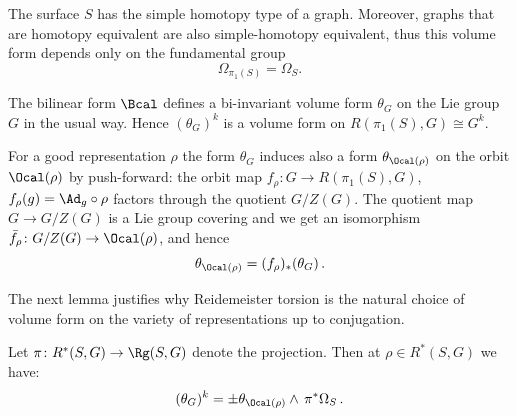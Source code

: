 The surface $S$ has the simple homotopy type of a graph. Moreover, graphs that are homotopy equivalent are also simple-homotopy equivalent, thus this volume form depends only on the fundamental group
\[
\Omega_{\pi_1(S)}=\Omega_S.
\]

The bilinear form $\Bcal$ defines a bi-invariant volume form $\theta_G$ on the Lie group $G$ in the usual way. Hence $(\theta_G)^{k}$ is a volume form on $R(\pi_1(S),G)\cong G^k$.

For a good representation $\rho$ the form $\theta_G$ induces also a form $\theta_{\Ocal(\rho)}$ on the orbit $\Ocal(\rho)$ by push-forward: the orbit map $f_\rho\colon G \to R(\pi_1(S),G)$, $f_\rho(g) = \Ad_g \circ \rho$ factors through the quotient $G/Z(G)$. The quotient map $G\to G/Z(G)$ is a Lie group covering and we get an isomorphism $\bar f_\rho\colon G/Z(G)\to \Ocal(\rho)$, and hence
\begin{equation}\label{eq:push_forward}
\theta_{\Ocal(\rho)}= (f_\rho)_* (\theta_{G})\,.
\end{equation}

The next lemma justifies why Reidemeister torsion is the natural choice of volume form on the variety of representations up to conjugation.

\begin{lemm}\label{lemma:volume_orbits}
Let $\pi\colon R^*(S,G)\to \Rg(S, G)$ denote the projection. Then at $\rho\in R^*(S,G)$ we have:
\[
(\theta_G)^{k} = \pm \theta_{\Ocal(\rho)} \wedge \,{\pi^* \Omega_{S}}\,.
\]
\end{lemm}


